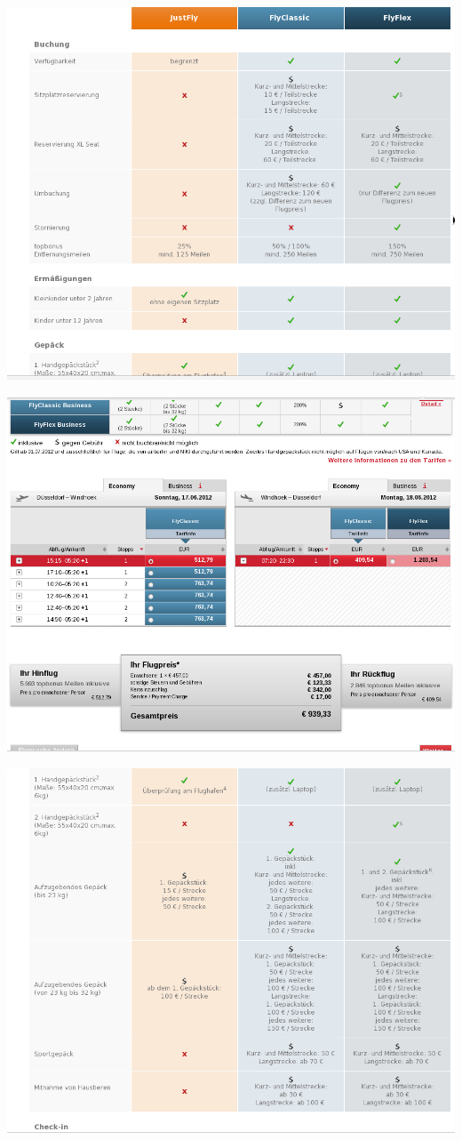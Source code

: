 \documentclass[11pt]{article}
\begin{document}
\includegraphics[scale=0.45]{Flug_Air_Berlin/Bildschirmfoto_am_2012-06-13_14_47_20.png} 

\includegraphics[scale=0.45]{Flug_Air_Berlin/Bildschirmfoto_am_2012-06-13_14_47_22.png} 

\includegraphics[scale=0.45]{Flug_Air_Berlin/Bildschirmfoto_am_2012-06-13_14_47_26.png} 
\end{document}
